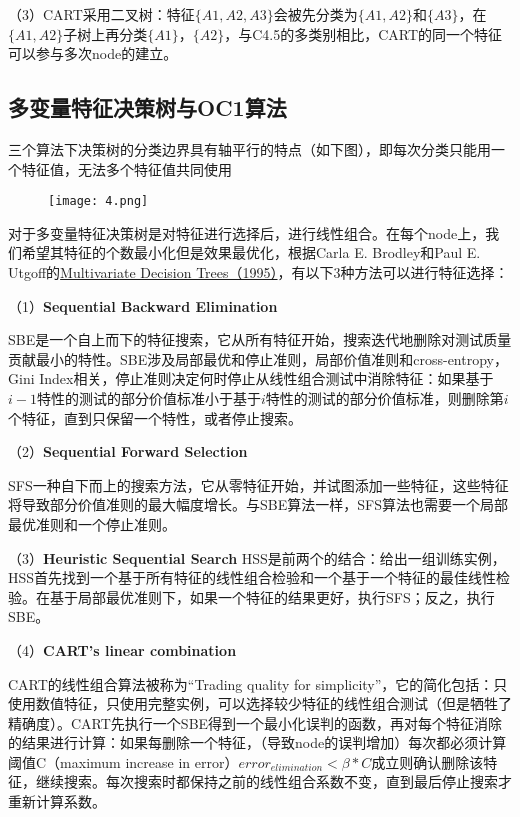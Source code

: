 \documentclass[cn]{elegantpaper}
\begin{document}
\noindent（3）CART采用二叉树：特征$\lbrace A1,A2,A3\rbrace$会被先分类为$\lbrace A1,A2\rbrace$和$\lbrace A3\rbrace$，在$\lbrace A1,A2\rbrace$子树上再分类$\lbrace A1\rbrace$，$\lbrace A2\rbrace$，与C4.5的多类别相比，CART的同一个特征可以参与多次node的建立。

\subsection{多变量特征决策树与OC1算法}
三个算法下决策树的分类边界具有轴平行的特点（如下图），即每次分类只能用一个特征值，无法多个特征值共同使用

\bigbreak
\begin{figure}[H]
    \centering
	\texttt{[image: 4.png]}
\end{figure}

对于多变量特征决策树是对特征进行选择后，进行线性组合。在每个node上，我们希望其特征的个数最小化但是效果最优化，根据Carla E. Brodley和Paul E. Utgoff的\href{https://link.springer.com/article/10.1023/A:1022607123649}{Multivariate Decision Trees（1995）}，有以下3种方法可以进行特征选择：

\bigbreak
\noindent（1）\textbf{Sequential Backward Elimination}

SBE是一个自上而下的特征搜索，它从所有特征开始，搜索迭代地删除对测试质量贡献最小的特性。SBE涉及局部最优和停止准则，局部价值准则和cross-entropy，Gini Index相关，停止准则决定何时停止从线性组合测试中消除特征：如果基于${i -1}$特性的测试的部分价值标准小于基于$i$特性的测试的部分价值标准，则删除第$i$个特征，直到只保留一个特性，或者停止搜索。

\bigbreak
\noindent（2）\textbf{Sequential Forward Selection}

SFS一种自下而上的搜索方法，它从零特征开始，并试图添加一些特征，这些特征将导致部分价值准则的最大幅度增长。与SBE算法一样，SFS算法也需要一个局部最优准则和一个停止准则。

\bigbreak
\noindent（3）\textbf{Heuristic Sequential Search}
HSS是前两个的结合：给出一组训练实例，HSS首先找到一个基于所有特征的线性组合检验和一个基于一个特征的最佳线性检验。在基于局部最优准则下，如果一个特征的结果更好，执行SFS；反之，执行SBE。

\bigbreak
\noindent（4）\textbf{CART's linear combination}

CART的线性组合算法被称为“Trading quality for simplicity”，它的简化包括：只使用数值特征，只使用完整实例，可以选择较少特征的线性组合测试（但是牺牲了精确度）。CART先执行一个SBE得到一个最小化误判的函数，再对每个特征消除的结果进行计算：如果每删除一个特征，（导致node的误判增加）每次都必须计算阈值C（maximum increase in error）$error_{elimination}< \beta * C $成立则确认删除该特征，继续搜索。每次搜索时都保持之前的线性组合系数不变，直到最后停止搜索才重新计算系数。
\end{document}
